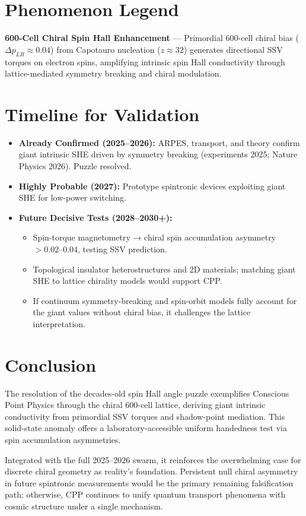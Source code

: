 \documentclass[11pt]{article}
\begin{document}
\section{Phenomenon Legend}
\textbf{600-Cell Chiral Spin Hall Enhancement} — Primordial 600-cell chiral bias ($\Delta p_{LR} \approx 0.04$) from Capotauro nucleation ($z \approx 32$) generates directional SSV torques on electron spins, amplifying intrinsic spin Hall conductivity through lattice-mediated symmetry breaking and chiral modulation.

\section{Timeline for Validation}
\begin{itemize}
    \item \textbf{Already Confirmed (2025--2026):} ARPES, transport, and theory confirm giant intrinsic SHE driven by symmetry breaking (experiments 2025; Nature Physics 2026). Puzzle resolved.
    \item \textbf{Highly Probable (2027):} Prototype spintronic devices exploiting giant SHE for low-power switching.
    \item \textbf{Future Decisive Tests (2028--2030+):}
    \begin{itemize}
        \item Spin-torque magnetometry → chiral spin accumulation asymmetry $>0.02$--$0.04$, testing SSV prediction.
        \item Topological insulator heterostructures and 2D materials; matching giant SHE to lattice chirality models would support CPP.
        \item If continuum symmetry-breaking and spin-orbit models fully account for the giant values without chiral bias, it challenges the lattice interpretation.
    \end{itemize}
\end{itemize}

\section{Conclusion}
The resolution of the decades-old spin Hall angle puzzle exemplifies Conscious Point Physics through the chiral 600-cell lattice, deriving giant intrinsic conductivity from primordial SSV torques and shadow-point mediation. This solid-state anomaly offers a laboratory-accessible uniform handedness test via spin accumulation asymmetries.  

Integrated with the full 2025--2026 swarm, it reinforces the overwhelming case for discrete chiral geometry as reality's foundation. Persistent null chiral asymmetry in future spintronic measurements would be the primary remaining falsification path; otherwise, CPP continues to unify quantum transport phenomena with cosmic structure under a single mechanism.
\end{document}
